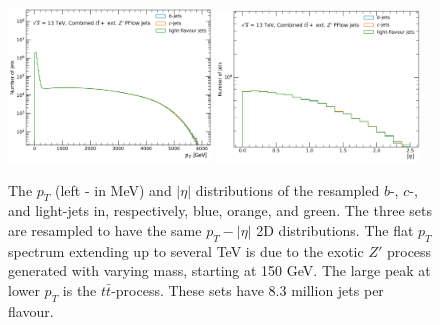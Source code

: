 \begin{figure}[h!]
  \center
  \includegraphics[width=0.48\textwidth]{Images/FTAG/DL1d/ptdist.png}
  \includegraphics[width=0.48\textwidth]{Images/FTAG/DL1d/etadist.png}
  \caption{The $p_T$ (left - in MeV) and $|\eta|$ distributions of the resampled $b$-, $c$-, and light-jets in, respectively, blue, orange, and green. The three sets are resampled to have the same $p_T-|\eta|$ 2D distributions. The flat $p_T$ spectrum extending up to several TeV is due to the exotic $Z'$ process generated with varying mass, starting at 150 GeV. The large peak at lower $p_T$ is the $t\bar{t}$-process. These sets have 8.3 million jets per flavour.} 
  \label{fig:distTraining}
\end{figure}

